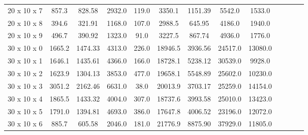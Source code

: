 \documentclass{article}
\begin{document}
\begin{table}[]
\begin{tabular}{ccccccccccccc}
	    		20     x 10   x 7   & 857.3                        & 828.58            & 2932.0                   & 119.0                    & 3350.1                       & 1151.39         & 5542.0                   & 1533.0                   \\
	    		20     x 10   x 8   & 394.6                        & 321.91           & 1168.0                   & 107.0                    & 2988.5                       & 645.95            & 4186.0                   & 1940.0                   \\
	    		20     x 10   x 9   & 496.7                        & 390.92           & 1323.0                   & 91.0                     & 3227.5                       & 867.74           & 4936.0                   & 1776.0                   \\
	    		30     x 10   x 0   & 1665.2                       & 1474.33            & 4313.0                   & 226.0                    & 18946.5                      & 3936.56          & 24517.0                  & 13080.0                  \\
	    		30     x 10   x 1   & 1646.1                       & 1435.61           & 4366.0                   & 166.0                    & 18728.1                      & 5238.12            & 30539.0                  & 9928.0                   \\
	    		30     x 10   x 2   & 1623.9                       & 1304.13           & 3853.0                   & 477.0                    & 19658.1                      & 5548.89            & 25602.0                  & 10230.0                  \\
	    		30     x 10   x 3   & 3051.2                       & 2162.46          & 6631.0                   & 38.0                     & 20013.9                      & 3703.17          & 25259.0                  & 14154.0                  \\
	    		30     x 10   x 4   & 1865.5                       & 1433.32          & 4004.0                   & 307.0                    & 18737.6                      & 3993.58           & 25010.0                  & 13423.0                  \\
	    		30     x 10   x 5   & 1791.0                       & 1394.81           & 4693.0                   & 386.0                    & 17647.8                      & 4006.52            & 23196.0                  & 12072.0                  \\
	    		30     x 10   x 6   & 885.7                        & 605.58            & 2046.0                   & 181.0                    & 21776.9                      & 8875.90            & 37929.0                  & 11805.0                  \\

\end{tabular}
\end{table}
\end{document}
